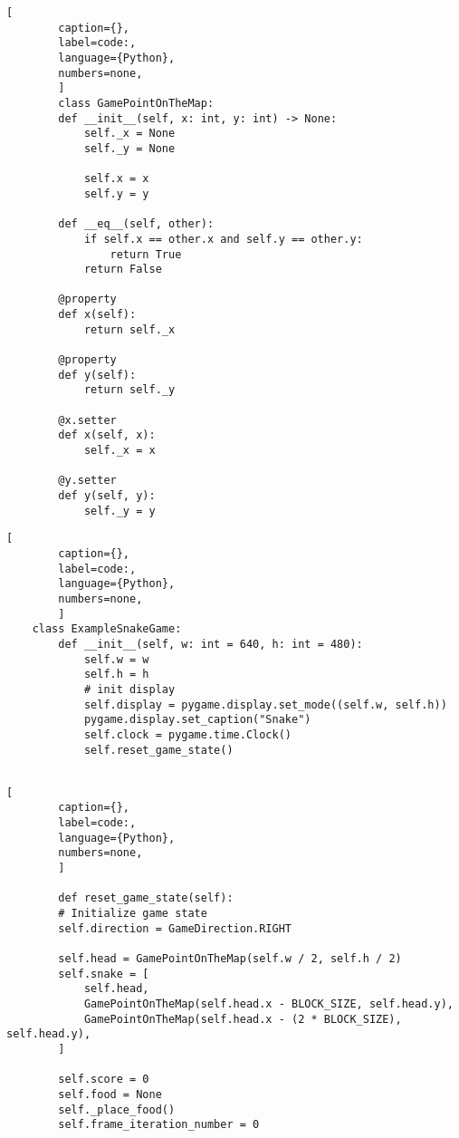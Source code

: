 \begin{onepage}
    \begin{lstlisting}[
        caption={},
        label=code:,
        language={Python},
        numbers=none,
        ]
        class GamePointOnTheMap:
        def __init__(self, x: int, y: int) -> None:
            self._x = None
            self._y = None
    
            self.x = x
            self.y = y
    
        def __eq__(self, other):
            if self.x == other.x and self.y == other.y:
                return True
            return False
    
        @property
        def x(self):
            return self._x
    
        @property
        def y(self):
            return self._y
    
        @x.setter
        def x(self, x):
            self._x = x
    
        @y.setter
        def y(self, y):
            self._y = y
    \end{lstlisting}
\end{onepage}


\begin{onepage}
    \begin{lstlisting}[
        caption={},
        label=code:,
        language={Python},
        numbers=none,
        ]
    class ExampleSnakeGame:
        def __init__(self, w: int = 640, h: int = 480):
            self.w = w
            self.h = h
            # init display
            self.display = pygame.display.set_mode((self.w, self.h))
            pygame.display.set_caption("Snake")
            self.clock = pygame.time.Clock()
            self.reset_game_state()
    
    \end{lstlisting}
\end{onepage}


\begin{onepage}
    \begin{lstlisting}[
        caption={},
        label=code:,
        language={Python},
        numbers=none,
        ]

        def reset_game_state(self):
        # Initialize game state
        self.direction = GameDirection.RIGHT

        self.head = GamePointOnTheMap(self.w / 2, self.h / 2)
        self.snake = [
            self.head,
            GamePointOnTheMap(self.head.x - BLOCK_SIZE, self.head.y),
            GamePointOnTheMap(self.head.x - (2 * BLOCK_SIZE), self.head.y),
        ]

        self.score = 0
        self.food = None
        self._place_food()
        self.frame_iteration_number = 0

    \end{lstlisting}
\end{onepage}

